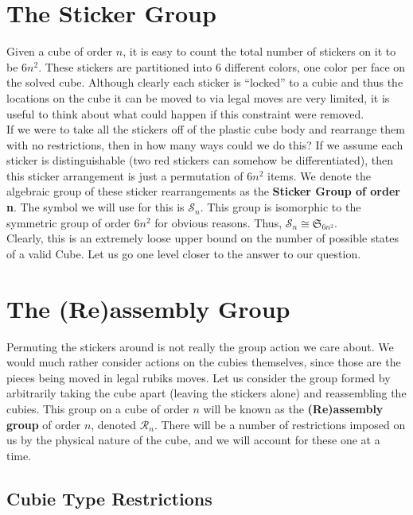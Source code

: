 \documentclass[10pt,letterpaper]{report}
\begin{document}
\section{The Sticker Group}
Given a cube of order $n$, it is easy to count the total number of stickers on it to be $6n^2$.  These stickers are partitioned into 6 different colors, one color per face on the solved cube.  Although clearly each sticker is ``locked'' to a cubie and thus the locations on the cube it can be moved to via legal moves are very limited, it is useful to think about what could happen if this constraint were removed. \\

If we were to take all the stickers off of the plastic cube body and rearrange them with no restrictions, then in how many ways could we do this?  If we assume each sticker is distinguishable (two red stickers can somehow be differentiated), then this sticker arrangement is just a permutation of $6n^2$ items.  We denote the algebraic group of these sticker rearrangements as the \textbf{Sticker Group of order n}.  The symbol we will use for this is $\mathcal{S}_n$.  This group is isomorphic to the symmetric group of order $6n^2$ for obvious reasons.  Thus, $\mathcal{S}_n \cong \mathfrak{S}_{6n^2}$. \\

Clearly, this is an extremely loose upper bound on the number of possible states of a valid Cube.  Let us go one level closer to the answer to our question.

\section{The (Re)assembly Group}
Permuting the stickers around is not really the group action we care about.  We would much rather consider actions on the cubies themselves, since those are the pieces being moved in legal rubiks moves.  Let us consider the group formed by arbitrarily taking the cube apart (leaving the stickers alone) and reassembling the cubies.  This group on a cube of order $n$ will be known as the \textbf{(Re)assembly group} of order $n$, denoted $\mathcal{R}_n$.  There will be a number of restrictions imposed on us by the physical nature of the cube, and we will account for these one at a time.

\subsection{Cubie Type Restrictions}
\end{document}
